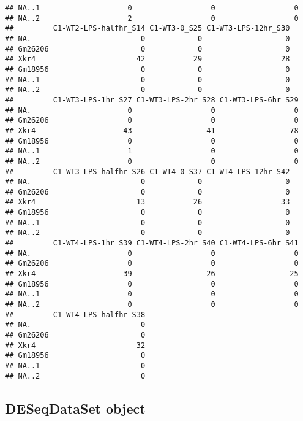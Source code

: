 \documentclass[
]{article}
\begin{document}
\begin{verbatim}
## NA..1                    0                  0                  0
## NA..2                    2                  0                  0
##         C1-WT2-LPS-halfhr_S14 C1-WT3-0_S25 C1-WT3-LPS-12hr_S30
## NA.                         0            0                   0
## Gm26206                     0            0                   0
## Xkr4                       42           29                  28
## Gm18956                     0            0                   0
## NA..1                       0            0                   0
## NA..2                       0            0                   0
##         C1-WT3-LPS-1hr_S27 C1-WT3-LPS-2hr_S28 C1-WT3-LPS-6hr_S29
## NA.                      0                  0                  0
## Gm26206                  0                  0                  0
## Xkr4                    43                 41                 78
## Gm18956                  0                  0                  0
## NA..1                    1                  0                  0
## NA..2                    0                  0                  0
##         C1-WT3-LPS-halfhr_S26 C1-WT4-0_S37 C1-WT4-LPS-12hr_S42
## NA.                         0            0                   0
## Gm26206                     0            0                   0
## Xkr4                       13           26                  33
## Gm18956                     0            0                   0
## NA..1                       0            0                   0
## NA..2                       0            0                   0
##         C1-WT4-LPS-1hr_S39 C1-WT4-LPS-2hr_S40 C1-WT4-LPS-6hr_S41
## NA.                      0                  0                  0
## Gm26206                  0                  0                  0
## Xkr4                    39                 26                 25
## Gm18956                  0                  0                  0
## NA..1                    0                  0                  0
## NA..2                    0                  0                  0
##         C1-WT4-LPS-halfhr_S38
## NA.                         0
## Gm26206                     0
## Xkr4                       32
## Gm18956                     0
## NA..1                       0
## NA..2                       0
\end{verbatim}

\hypertarget{deseqdataset-object}{%
\subsection{DESeqDataSet object}\label{deseqdataset-object}}
\end{document}
